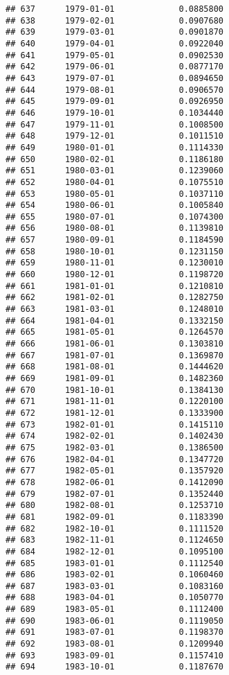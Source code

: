 \documentclass[
]{article}
\begin{document}
\begin{verbatim}
## 637      1979-01-01             0.0885800
## 638      1979-02-01             0.0907680
## 639      1979-03-01             0.0901870
## 640      1979-04-01             0.0922040
## 641      1979-05-01             0.0902530
## 642      1979-06-01             0.0877170
## 643      1979-07-01             0.0894650
## 644      1979-08-01             0.0906570
## 645      1979-09-01             0.0926950
## 646      1979-10-01             0.1034440
## 647      1979-11-01             0.1008500
## 648      1979-12-01             0.1011510
## 649      1980-01-01             0.1114330
## 650      1980-02-01             0.1186180
## 651      1980-03-01             0.1239060
## 652      1980-04-01             0.1075510
## 653      1980-05-01             0.1037110
## 654      1980-06-01             0.1005840
## 655      1980-07-01             0.1074300
## 656      1980-08-01             0.1139810
## 657      1980-09-01             0.1184590
## 658      1980-10-01             0.1231150
## 659      1980-11-01             0.1230010
## 660      1980-12-01             0.1198720
## 661      1981-01-01             0.1210810
## 662      1981-02-01             0.1282750
## 663      1981-03-01             0.1248010
## 664      1981-04-01             0.1332150
## 665      1981-05-01             0.1264570
## 666      1981-06-01             0.1303810
## 667      1981-07-01             0.1369870
## 668      1981-08-01             0.1444620
## 669      1981-09-01             0.1482360
## 670      1981-10-01             0.1384130
## 671      1981-11-01             0.1220100
## 672      1981-12-01             0.1333900
## 673      1982-01-01             0.1415110
## 674      1982-02-01             0.1402430
## 675      1982-03-01             0.1386500
## 676      1982-04-01             0.1347720
## 677      1982-05-01             0.1357920
## 678      1982-06-01             0.1412090
## 679      1982-07-01             0.1352440
## 680      1982-08-01             0.1253710
## 681      1982-09-01             0.1183390
## 682      1982-10-01             0.1111520
## 683      1982-11-01             0.1124650
## 684      1982-12-01             0.1095100
## 685      1983-01-01             0.1112540
## 686      1983-02-01             0.1060460
## 687      1983-03-01             0.1083160
## 688      1983-04-01             0.1050770
## 689      1983-05-01             0.1112400
## 690      1983-06-01             0.1119050
## 691      1983-07-01             0.1198370
## 692      1983-08-01             0.1209940
## 693      1983-09-01             0.1157410
## 694      1983-10-01             0.1187670

\end{verbatim}
\end{document}
